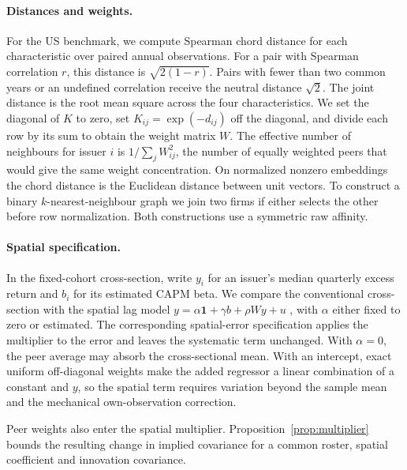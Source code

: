 \paragraph{Distances and weights.}
For the US benchmark, we compute Spearman chord distance for each
characteristic over paired annual observations. For a pair with
Spearman correlation $r$, this distance is $\sqrt{2(1-r)}$. Pairs
with fewer than
two common years or an undefined correlation receive the neutral
distance $\sqrt{2}$. The joint distance is the root mean square
across the four characteristics. We set the diagonal of $K$ to zero,
set $K_{ij}=\exp(-d_{ij})$ off the diagonal, and divide each row by
its sum to obtain the weight matrix $W$. The effective number of
neighbours for issuer $i$ is
$1/\sum_j W_{ij}^2$, the number of equally weighted peers that would
give the same weight concentration. On normalized nonzero embeddings
the chord distance is the
Euclidean distance between unit vectors. To construct a binary
$k$-nearest-neighbour graph we join two firms if either selects the
other before row normalization. Both constructions use a symmetric raw affinity.

\paragraph{Spatial specification.}
In the fixed-cohort cross-section, write $y_i$ for an issuer's median
quarterly excess return and $b_i$ for its estimated CAPM beta. We compare
the conventional cross-section with the spatial lag model
$y=\alpha\mathbf{1}+\gamma b+\rho Wy+u$
\citep{anselin1988,lesage2009}, with $\alpha$ either fixed to zero or
estimated. The corresponding spatial-error specification
applies the multiplier to the error and leaves the systematic term
unchanged. With $\alpha=0$, the peer average may absorb the
cross-sectional mean. With an intercept, exact uniform off-diagonal
weights make the added regressor a linear combination of a constant
and $y$, so the spatial term requires variation beyond the sample
mean and the mechanical own-observation correction.

Peer weights also enter the spatial multiplier.
Proposition~\ref{prop:multiplier}
bounds the resulting change in implied covariance for a common roster,
spatial coefficient and innovation covariance.

